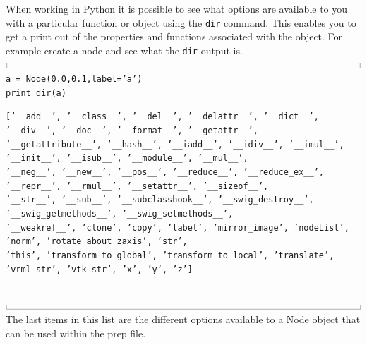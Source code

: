 \documentclass[12pt,a4paper,twoside]{article}
\newcommand{\topbar}{\ensuremath{
    \rule{0.1mm}{2.0mm} \rule[2.0mm]{159.5mm}{0.1mm} \rule{0.1mm}{2.0mm}
}}
\newcommand{\bottombar}{\ensuremath{
    \rule{0.1mm}{2.0mm} \rule{159.5mm}{0.1mm} \rule{0.1mm}{2.0mm}
}}
\begin{document}
\medskip
When working in Python it is possible to see what options are available to you with a particular
function or object using the \texttt{dir} command. This enables you to get a print out of the properties
and functions associated with the object. For example create a node and see what the \texttt{dir} output is.\\
\topbar\\
\texttt{a = Node(0.0,0.1,label='a')}\\
\texttt{print dir(a)}\\
\begin{scriptsize}
\texttt{['\_\_add\_\_', '\_\_class\_\_', '\_\_del\_\_', '\_\_delattr\_\_', '\_\_dict\_\_', '\_\_div\_\_', '\_\_doc\_\_',
 '\_\_format\_\_', '\_\_getattr\_\_',\\ '\_\_getattribute\_\_', '\_\_hash\_\_', '\_\_iadd\_\_', '\_\_idiv\_\_', 
'\_\_imul\_\_', '\_\_init\_\_', '\_\_isub\_\_', '\_\_module\_\_', '\_\_mul\_\_',\\ '\_\_neg\_\_', '\_\_new\_\_', 
'\_\_pos\_\_', '\_\_reduce\_\_', '\_\_reduce\_ex\_\_', '\_\_repr\_\_', '\_\_rmul\_\_', '\_\_setattr\_\_', 
'\_\_sizeof\_\_',\\ '\_\_str\_\_', '\_\_sub\_\_', '\_\_subclasshook\_\_', '\_\_swig\_destroy\_\_', '\_\_swig\_getmethods\_\_', 
'\_\_swig\_setmethods\_\_',\\ '\_\_weakref\_\_', 'clone', 'copy', 'label', 'mirror\_image', 'nodeList', 'norm', 
'rotate\_about\_zaxis', 'str',\\ 'this', 'transform\_to\_global', 'transform\_to\_local', 'translate', 'vrml\_str', 
'vtk\_str', 'x', 'y', 'z']}\end{scriptsize}\\
\bottombar\\

The last items in this list are the different options available to a Node object that can be used within the
prep file.

\cleardoublepage
\end{document}
